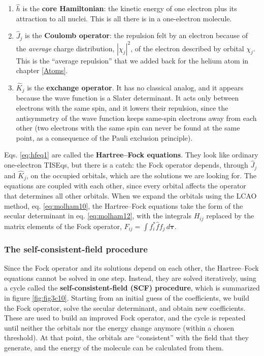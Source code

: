 \documentclass[
  english,
  9pt,
]{extbook}
\providecommand{\tightlist}{%
  \setlength{\itemsep}{0pt}\setlength{\parskip}{0pt}}
\theoremstyle{definition}
\theoremstyle{definition}
\theoremstyle{definition}
\theoremstyle{definition}
\theoremstyle{remark}
\begin{document}
\begin{enumerate}
\def\labelenumi{\arabic{enumi}.}
\tightlist
\item
  \(\hat{h}\) is the \textbf{core Hamiltonian}: the kinetic energy of one electron plus its attraction to all nuclei. This is all there is in a one-electron molecule.
\item
  \(\hat{J}_j\) is the \textbf{Coulomb operator}: the repulsion felt by an electron because of the \emph{average} charge distribution, \(|\chi_j|^2\), of the electron described by orbital \(\chi_j\). This is the ``average repulsion'' that we added back for the helium atom in chapter \ref{Atoms}.
\item
  \(\hat{K}_j\) is the \textbf{exchange operator}. It has no classical analog, and it appears because the wave function is a Slater determinant. It acts only between electrons with the same spin, and it lowers their repulsion, since the antisymmetry of the wave function keeps same-spin electrons away from each other (two electrons with the same spin can never be found at the same point, as a consequence of the Pauli exclusion principle).
\end{enumerate}

Eqs. \eqref{eq:hfeq1} are called the \textbf{Hartree--Fock equations}. They look like ordinary one-electron TISEqs, but there is a catch: the Fock operator depends, through \(\hat{J}_j\) and \(\hat{K}_j\), on the occupied orbitals, which are the solutions we are looking for. The equations are coupled with each other, since every orbital affects the operator that determines all other orbitals. When we expand the orbitals using the LCAO method, eq. \eqref{eq:molham10}, the Hartree--Fock equations take the form of the secular determinant in eq. \eqref{eq:molham12}, with the integrals \(H_{ij}\) replaced by the matrix elements of the Fock operator, \(F_{ij} = \int f_i^* \hat{f} f_j\, d\mathbf{\tau}\).

\subsubsection*{The self-consistent-field procedure}\label{the-self-consistent-field-procedure}

Since the Fock operator and its solutions depend on each other, the Hartree--Fock equations cannot be solved in one step. Instead, they are solved iteratively, using a cycle called the \textbf{self-consistent-field (SCF) procedure}, which is summarized in figure \ref{fig:fig3c10}. Starting from an initial guess of the coefficients, we build the Fock operator, solve the secular determinant, and obtain new coefficients. These are used to build an improved Fock operator, and the cycle is repeated until neither the orbitals nor the energy change anymore (within a chosen threshold). At that point, the orbitals are ``consistent'' with the field that they generate, and the energy of the molecule can be calculated from them.
\end{document}
